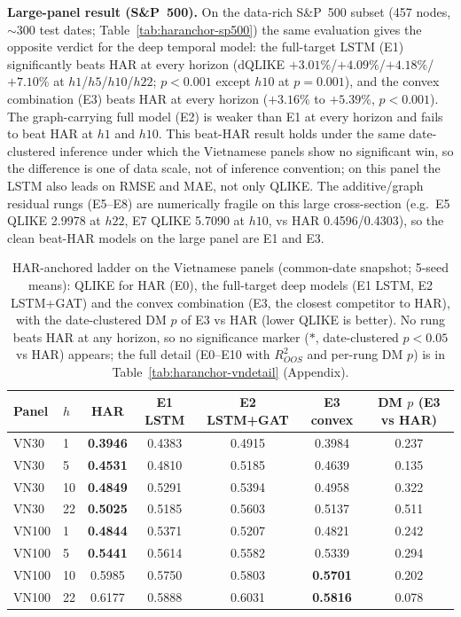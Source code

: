 \documentclass[runningheads]{llncs}
\begin{document}
\textbf{Large-panel result (S\&P~500).} On the data-rich S\&P~500 subset (457 nodes, $\sim$300 test dates;
Table~\ref{tab:haranchor-sp500}) the same evaluation gives the opposite verdict for the deep temporal model:
the full-target LSTM (E1) significantly beats HAR at every horizon (dQLIKE $+3.01\%$/$+4.09\%$/$+4.18\%$/%
$+7.10\%$ at $h1$/$h5$/$h10$/$h22$; $p<0.001$ except $h10$ at $p=0.001$), and the convex combination (E3)
beats HAR at every horizon ($+3.16\%$ to $+5.39\%$, $p<0.001$). The graph-carrying full model (E2) is weaker
than E1 at every horizon and fails to beat HAR at $h1$ and $h10$. This beat-HAR result holds under the same
date-clustered inference under which the Vietnamese panels show no significant win, so the difference is one
of data scale, not of inference convention; on this panel the LSTM also leads on RMSE and MAE, not only
QLIKE. The additive/graph residual rungs (E5--E8) are numerically fragile on this large cross-section
(e.g.\ E5 QLIKE 2.9978 at $h22$, E7 QLIKE 5.7090 at $h10$, vs HAR 0.4596/0.4303), so the clean beat-HAR
models on the large panel are E1 and E3.

\begin{table}[t]
\centering
\caption{HAR-anchored ladder on the Vietnamese panels (common-date snapshot; 5-seed means): QLIKE for
HAR (E0), the full-target deep models (E1 LSTM, E2 LSTM+GAT) and the convex combination (E3, the closest
competitor to HAR), with the date-clustered DM $p$ of E3 vs HAR (lower QLIKE is better). No rung beats HAR at
any horizon, so no significance marker ($*$, date-clustered $p<0.05$ vs HAR) appears; the full detail (E0--E10
with $R^2_{OOS}$ and per-rung DM $p$) is in Table~\ref{tab:haranchor-vndetail} (Appendix).}
\label{tab:haranchor-vnsummary}
\footnotesize
\setlength{\tabcolsep}{5pt}
\renewcommand{\arraystretch}{0.95}
\begin{tabular}{llcccc c}
\toprule
Panel & $h$ & HAR & E1 LSTM & E2 LSTM+GAT & E3 convex & DM $p$ (E3 vs HAR) \\
\midrule
VN30  & 1  & \textbf{0.3946} & 0.4383 & 0.4915 & 0.3984 & 0.237 \\
VN30  & 5  & \textbf{0.4531} & 0.4810 & 0.5185 & 0.4639 & 0.135 \\
VN30  & 10 & \textbf{0.4849} & 0.5291 & 0.5394 & 0.4958 & 0.322 \\
VN30  & 22 & \textbf{0.5025} & 0.5185 & 0.5603 & 0.5137 & 0.511 \\
\midrule
VN100 & 1  & \textbf{0.4844} & 0.5371 & 0.5207 & 0.4821 & 0.242 \\
VN100 & 5  & \textbf{0.5441} & 0.5614 & 0.5582 & 0.5339 & 0.294 \\
VN100 & 10 & 0.5985 & 0.5750 & 0.5803 & \textbf{0.5701} & 0.202 \\
VN100 & 22 & 0.6177 & 0.5888 & 0.6031 & \textbf{0.5816} & 0.078 \\
\bottomrule
\end{tabular}
\end{table}
\end{document}
